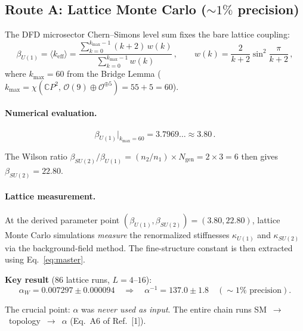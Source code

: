 \documentclass[12pt,a4paper]{article}
\begin{document}
\subsection{Route A: Lattice Monte Carlo ($\sim 1\%$ precision)}
\label{sec:lattice}

The DFD microsector Chern--Simons level sum fixes the bare lattice coupling:
\begin{equation}
\label{eq:beta-def}
\beta_{U(1)} = \langle k_{\mathrm{eff}} \rangle
= \frac{\displaystyle\sum_{k=0}^{k_{\max}-1}(k+2)\,w(k)}
       {\displaystyle\sum_{k=0}^{k_{\max}-1} w(k)}\,,
\qquad
w(k) = \frac{2}{k+2}\sin^2\!\frac{\pi}{k+2}\,,
\end{equation}
where $k_{\max} = 60$ from the Bridge Lemma
($k_{\max} = \chi(\mathbb{C}P^2,\,\mathcal{O}(9)\oplus\mathcal{O}^{\oplus 5})
= 55 + 5 = 60$).

\paragraph{Numerical evaluation.}
\begin{equation}
\beta_{U(1)}\big|_{k_{\max}=60} = 3.7969\ldots \approx 3.80\,.
\end{equation}

The Wilson ratio $\beta_{SU(2)}/\beta_{U(1)} = (n_2/n_1) \times N_{\mathrm{gen}}
= 2 \times 3 = 6$ then gives $\beta_{SU(2)} = 22.80$.

\paragraph{Lattice measurement.}
At the derived parameter point $(\beta_{U(1)}, \beta_{SU(2)}) = (3.80, 22.80)$,
lattice Monte Carlo simulations \emph{measure} the renormalized stiffnesses
$\kappa_{U(1)}$ and $\kappa_{SU(2)}$ via the background-field method.
The fine-structure constant is then extracted using Eq.~\eqref{eq:master}.

\textbf{Key result} (86 lattice runs, $L = 4$--$16$):
\begin{equation}
\alpha_W = 0.007297 \pm 0.000094
\quad\Longrightarrow\quad
\alpha^{-1} = 137.0 \pm 1.8
\quad(\sim 1\%\text{ precision}).
\end{equation}

The crucial point: $\alpha$ was \emph{never used as input}.
The entire chain runs SM~$\to$~topology~$\to$~$\alpha$ (Eq.~A6 of Ref.~[1]).
\end{document}
